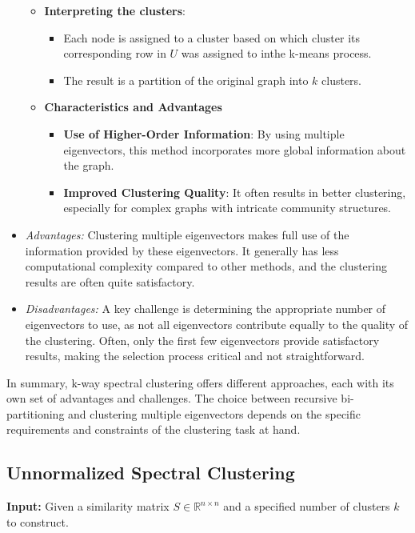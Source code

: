 \documentclass[unicode,11pt,a4paper,oneside,numbers=endperiod,openany]{scrartcl}
\begin{document}
\begin{itemize}
\begin{itemize}
{}
\item {\textbf{Interpreting the clusters}:
\begin{itemize}
 \item Each node is assigned to a cluster based on which cluster its corresponding row in $U$ was assigned to inthe k-means process.
 \item The result is a partition of the original graph into $k$ clusters.
\end{itemize}
}
\item {\textbf{Characteristics and Advantages}
\begin{itemize}
 \item {\textbf{Use of Higher-Order Information}: By using multiple eigenvectors, this method incorporates more global information about the graph.}
 \item {\textbf{Improved Clustering Quality}: It often results in better clustering, especially for complex graphs with intricate community structures.}
\end{itemize}
}
    \end{itemize}

    \item \textit{Advantages:} Clustering multiple eigenvectors makes full use of the information provided by these eigenvectors. It generally has less computational complexity compared to other methods, and the clustering results are often quite satisfactory.

    \item \textit{Disadvantages:} A key challenge is determining the appropriate number of eigenvectors to use, as not all eigenvectors contribute equally to the quality of the clustering. Often, only the first few eigenvectors provide satisfactory results, making the selection process critical and not straightforward.
\end{itemize}

In summary, k-way spectral clustering offers different approaches, each with its own set of advantages and challenges. The choice between recursive bi-partitioning and clustering multiple eigenvectors depends on the specific requirements and constraints of the clustering task at hand.


\subsection{Unnormalized Spectral Clustering}

\textbf{Input:} Given a similarity matrix \( S \in \mathbb{R}^{n \times n} \) and a specified number of clusters \( k \) to construct.
\end{document}

